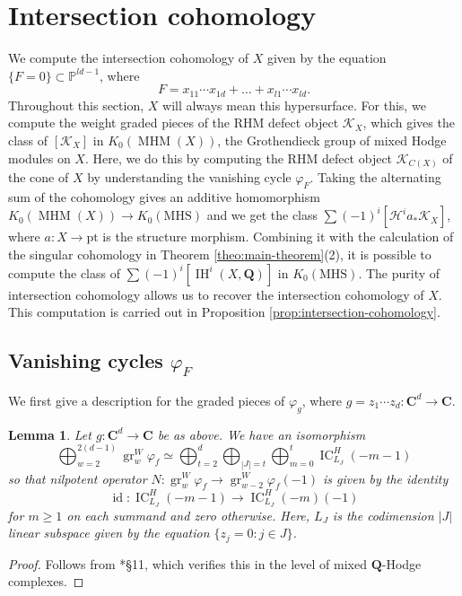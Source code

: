 \documentclass[letterpaper,11pt]{amsart}
\theoremstyle{plain}
\newtheorem{lemm}[theo]{Lemma}
\theoremstyle{definition}
\theoremstyle{remark}
\newcommand{\PP}{\mathbb{P}}
\newcommand{\QQ}{\mathbf{Q}}
\newcommand{\CC}{\mathbf{C}}
\newcommand{\cH}{\mathcal{H}}
\newcommand{\cK}{\mathcal{K}}
\newcommand{\lsta}{_{*}}
\DeclareMathOperator{\id}{id}
\DeclareMathOperator{\gr}{gr}
\DeclareMathOperator{\IC}{IC}
\DeclareMathOperator{\IH}{IH}
\DeclareMathOperator{\MHM}{MHM}
\begin{document}
    \section{Intersection cohomology}
    We compute the intersection cohomology of $X$ given by the equation $\{ F = 0  \} \subset \PP^{ld-1}$, where
    $$ F = x_{11} \cdots x_{1d} + \ldots + x_{l1} \cdots x_{ld}.$$
    Throughout this section, $X$ will always mean this hypersurface. For this, we compute the weight graded pieces of the RHM defect object $\cK_{X}$, which gives the class of $[\cK_{X}]$ in $K_{0}(\MHM(X))$, the Grothendieck group of mixed Hodge modules on $X$. Here, we do this by computing the RHM defect object $\cK_{C(X)}$ of the cone of $X$ by understanding the vanishing cycle $\varphi_{F}$. Taking the alternating sum of the cohomology gives an additive homomorphism $K_{0}(\MHM(X)) \to K_{0}(\mathrm{MHS})$ and we get the class $\sum (-1)^{i} [\cH^{i} a\lsta \cK_{X}]$, where $a \colon X \to \mathrm{pt}$ is the structure morphism. Combining it with the calculation of the singular cohomology in Theorem \ref{theo:main-theorem}(2), it is possible to compute the class of $\sum (-1)^{i} [\IH^{i}(X, \QQ)]$ in $K_{0}(\mathrm{MHS})$. The purity of intersection cohomology allows us to recover the intersection cohomology of $X$. This computation is carried out in Proposition \ref{prop:intersection-cohomology}.

    \subsection{Vanishing cycles $\varphi_{F}$}
    We first give a description for the graded pieces of $\varphi_{g}$, where $g = z_{1}\cdots z_{d} \colon \CC^{d} \to \CC$.

    \begin{lemm} \label{lemm:grW-vanishing-cycle-snc}
       Let $g\colon \CC^{d} \to \CC$ be as above. We have an isomorphism
        $$ \bigoplus_{w = 2}^{2(d-1)} \gr_{w}^{W} \varphi_{f} \simeq \bigoplus_{t = 2}^{d} \bigoplus_{|J| = t} \bigoplus_{m=0}^{t} \IC_{L_{J}}^{H}(-m-1)$$
        so that nilpotent operator $N \colon \gr_{w}^{W} \varphi_{f} \to \gr_{w-2}^{W}\varphi_{f} (-1)$ is given by the identity
            $$ \id : \IC_{L_{J}}^{H}(-m-1)  \to \IC_{L_{J}}^{H}(-m)(-1)$$
        for $m \geq 1$ on each summand and zero otherwise. Here, $L_{J}$ is the codimension $|J|$ linear subspace given by the equation $\{ z_{j} = 0 : j \in J\}$.
    \end{lemm}
    \begin{proof}
        Follows from \cite{Peters-Steenbrink:MHS}*{\S11}, which verifies this in the level of mixed $\QQ$-Hodge complexes.
    \end{proof}
\end{document}
